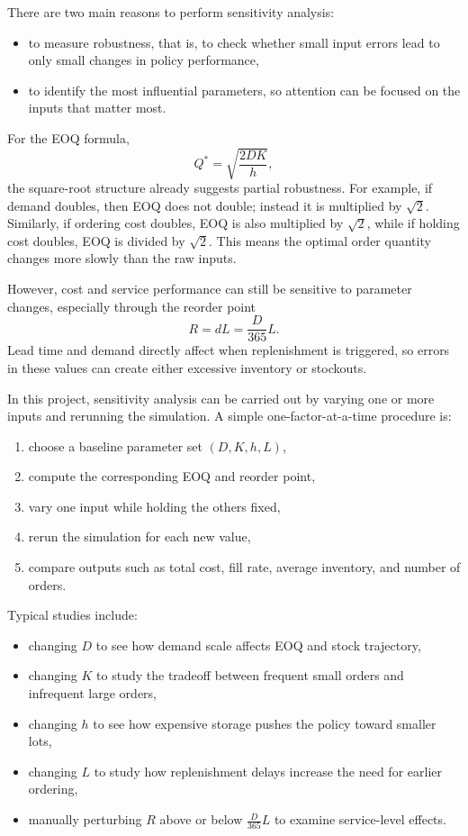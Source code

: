 \documentclass[11pt]{article}
\begin{document}
There are two main reasons to perform sensitivity analysis:
\begin{itemize}
  \item to measure robustness, that is, to check whether small input errors lead to only small changes in policy performance,
  \item to identify the most influential parameters, so attention can be focused on the inputs that matter most.
\end{itemize}

For the EOQ formula,
\begin{equation}
Q^* = \sqrt{\frac{2DK}{h}},
\end{equation}
the square-root structure already suggests partial robustness. For example, if demand doubles, then EOQ does not double; instead it is multiplied by $\sqrt{2}$. Similarly, if ordering cost doubles, EOQ is also multiplied by $\sqrt{2}$, while if holding cost doubles, EOQ is divided by $\sqrt{2}$. This means the optimal order quantity changes more slowly than the raw inputs.

However, cost and service performance can still be sensitive to parameter changes, especially through the reorder point
\begin{equation}
R = dL = \frac{D}{365}L.
\end{equation}
Lead time and demand directly affect when replenishment is triggered, so errors in these values can create either excessive inventory or stockouts.

In this project, sensitivity analysis can be carried out by varying one or more inputs and rerunning the simulation. A simple one-factor-at-a-time procedure is:
\begin{enumerate}
  \item choose a baseline parameter set $(D, K, h, L)$,
  \item compute the corresponding EOQ and reorder point,
  \item vary one input while holding the others fixed,
  \item rerun the simulation for each new value,
  \item compare outputs such as total cost, fill rate, average inventory, and number of orders.
\end{enumerate}

Typical studies include:
\begin{itemize}
  \item changing $D$ to see how demand scale affects EOQ and stock trajectory,
  \item changing $K$ to study the tradeoff between frequent small orders and infrequent large orders,
  \item changing $h$ to see how expensive storage pushes the policy toward smaller lots,
  \item changing $L$ to study how replenishment delays increase the need for earlier ordering,
  \item manually perturbing $R$ above or below $\frac{D}{365}L$ to examine service-level effects.
\end{itemize}
\end{document}
